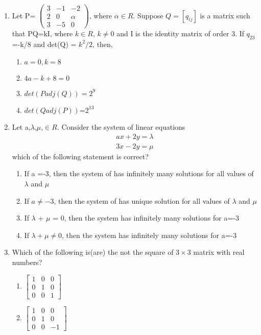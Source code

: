 \begin{enumerate}[label=\arabic*.,ref=\thesubsection.\theenumi]
\item Let P= $\begin{pmatrix} 3 & -1 & -2  \\ 2 & 0 & \alpha \\ 3 & -5 & 0\end{pmatrix}$, where $\alpha\in R$. Suppose $Q=[q_{ij}]$ is a matrix such that PQ=kI, where $k\in R$, $k\neq0$ and I is the identity matrix of order 3. If $q_{23}$ =-k/8 and det(Q) = $k^2/2$, then, 
\begin{enumerate}
 \item $a=0, k=8$
 \item $4a-k+8=0$
 \item $det(Padj(Q)) = 2^9$ 
 \item $det(Qadj(P))$=$2^{13}$
\end{enumerate}
\item Let a,$\lambda$,$\mu$,$\in R$. Consider the system of linear equations 
\begin{align}
ax+2y=\lambda 
\end{align}   
\begin{align} 
3x-2y=\mu 
\end{align}
which of the following statement is correct?
\begin{enumerate}
 \item If a =-3, then the system of has infinitely many solutions for all values of $\lambda$ and $\mu$
 \item If $a\neq-3$, then the system of has unique  solution for all values of $\lambda$ and $\mu$
 \item If $\lambda$ + $\mu$ = 0, then the system has infinitely many solutions for a=-3
 \item If $\lambda + \mu\neq0$, then the system has infinitely many solutions for a=-3
\end{enumerate}
\item Which of the following is(are) the not the square of $3\times3$ matrix with real numbers?
\begin{enumerate}
 \item $\begin{bmatrix} 1 & 0 & 0  \\ 0 & 1 & 0 \\0 & 0 & 1 \end{bmatrix}$
 \item $\begin{bmatrix} 1 & 0 & 0  \\ 0 & 1 & 0 \\0 & 0 & -1 \end{bmatrix}$

\end{enumerate}
\end{enumerate}
